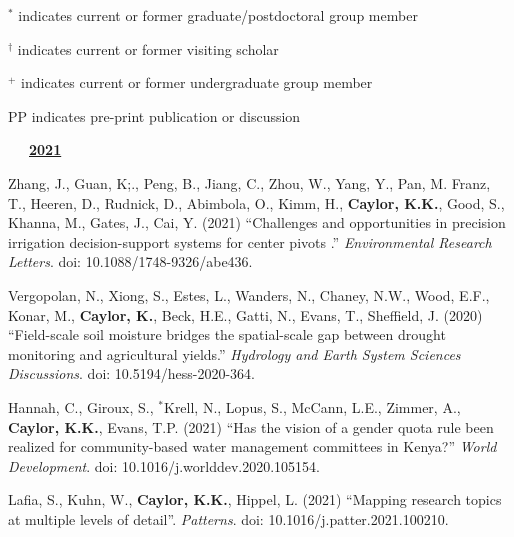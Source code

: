 \documentclass[10pt]{report}
\begin{document}
{ \small $^{*}$ indicates current or former graduate/postdoctoral group member}

{ \small $^{\dagger}$ indicates current or former visiting scholar}

{ \small $^{+}$ indicates current or former undergraduate group member}


{ PP indicates pre-print publication or discussion}

\vspace*{.1in}

\mbox{\ \ \ \underline{\textbf{2021}}}

\begin{etaremune}


\item Zhang, J., Guan, K;., Peng, B., Jiang, C., Zhou, W., Yang, Y., Pan, M. Franz, T., Heeren, D., Rudnick, D., Abimbola, O., Kimm, H., \textbf{Caylor, K.K.}, Good, S., Khanna, M., Gates, J., Cai, Y. (2021) ``Challenges and opportunities in precision irrigation decision-support systems for center pivots .'' {\em Environmental Research Letters}. doi: 10.1088/1748-9326/abe436.

\item Vergopolan, N., Xiong, S., Estes, L., Wanders, N., Chaney, N.W., Wood, E.F., Konar, M., \textbf{Caylor, K.}, Beck, H.E., Gatti, N., Evans, T.,  Sheffield, J. (2020) ``Field-scale soil moisture bridges the spatial-scale gap between drought monitoring and agricultural yields.'' {\em Hydrology and Earth System Sciences Discussions}. doi: 10.5194/hess-2020-364.

\item Hannah, C., Giroux, S., $^{*}$Krell, N., Lopus, S., McCann, L.E., Zimmer, A., \textbf{Caylor, K.K.}, Evans, T.P. (2021) ``Has the vision of a gender quota rule been realized for community-based water management committees in Kenya?'' {\em World Development}. doi: 10.1016/j.worlddev.2020.105154.

\item Lafia, S., Kuhn, W., \textbf{Caylor, K.K.}, Hippel, L. (2021) ``Mapping research topics at multiple levels of detail''. {\em Patterns}. doi: 10.1016/j.patter.2021.100210.


\end{etaremune}
\end{document}
